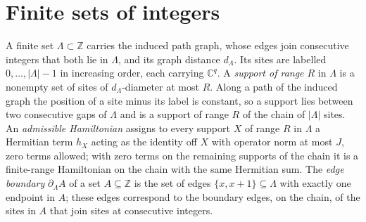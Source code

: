 \section{Finite sets of integers}

\begin{definition}
    \label{def:domain_model}
    \leanok
    A finite set $\Lambda\subset\mathbb Z$ carries the induced path graph, whose
    edges join consecutive integers that both lie in $\Lambda$, and its graph
    distance $d_\Lambda$. Its sites are labelled $0,\ldots,|\Lambda|-1$ in
    increasing order, each carrying $\mathbb C^q$. A \emph{support of range $R$}
    in $\Lambda$ is a nonempty set of sites of $d_\Lambda$-diameter at most $R$.
    Along a path of the induced graph the position of a site minus its label is
    constant, so a support lies between two consecutive gaps of $\Lambda$ and
    is a support of range $R$ of the chain of $|\Lambda|$ sites. An
    \emph{admissible Hamiltonian} assigns to every support $X$ of range $R$ in
    $\Lambda$ a Hermitian term $h_X$ acting as the identity off $X$ with
    operator norm at most $J$, zero terms allowed; with zero terms on the
    remaining supports of the chain it is a finite-range Hamiltonian on the
    chain with the same Hermitian sum. The \emph{edge boundary} $\partial_\Lambda A$ of a
    set $A\subseteq\mathbb Z$ is the set of edges $\{x,x+1\}\subseteq\Lambda$
    with exactly one endpoint in $A$; these edges correspond to the boundary
    edges, on the chain, of the sites in $A$ that join sites at consecutive
    integers.
\end{definition}

